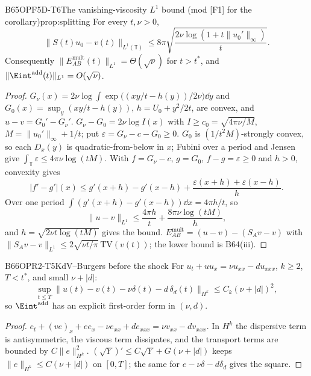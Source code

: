 \begin{dimcard}{B65}{OPF5D-T6}{The vanishing-viscosity $L^1$ bound}{\proved{} (mod [F1] for the corollary)}{prop:splitting}
For every $t,\nu>0$,
\[
\|S(t)u_0-v(t)\|_{L^1(\mathbb T)}\le8\pi\sqrt{\frac{2\nu\log(1+t\|u_0'\|_\infty)}{t}}.
\]
Consequently $\|E^{\mathrm{mult}}_{AB}(t)\|_{L^1}=\Theta(\sqrt\nu)$ for $t>t^*$, and $\|\Eint^{\mathrm{add}}(t)\|_{L^1}=O(\sqrt\nu)$.
\end{dimcard}
\begin{proof}
$G_\nu(x)=2\nu\log\int\exp\big((xy/t-h(y))/2\nu\big)\dd y$ and $G_0(x)=\sup_y(xy/t-h(y))$, $h=U_0+y^2/2t$, are convex, and $u-v=G_0'-G_\nu'$.
$G_\nu-G_0=2\nu\log I(x)$ with $I\ge c_0=\sqrt{4\pi\nu/M}$, $M=\|u_0'\|_\infty+1/t$; put $\varepsilon=G_\nu-c-G_0\ge0$.
$G_0$ is $(1/t^2M)$-strongly convex, so each $D_x(y)$ is quadratic-from-below in $x$; Fubini over a period and Jensen give $\int_{\mathbb T}\varepsilon\le4\pi\nu\log(tM)$.
With $f=G_\nu-c$, $g=G_0$, $f-g=\varepsilon\ge0$ and $h>0$, convexity gives
\[
|f'-g'|(x)\le g'(x+h)-g'(x-h)+\frac{\varepsilon(x+h)+\varepsilon(x-h)}{h}.
\]
Over one period $\int(g'(x+h)-g'(x-h))\dd x=4\pi h/t$, so
\[
\|u-v\|_{L^1}\le\frac{4\pi h}{t}+\frac{8\pi\nu\log(tM)}{h},
\]
and $h=\sqrt{2\nu t\log(tM)}$ gives the bound.
$E^{\mathrm{mult}}_{AB}=(u-v)-(S_Av-v)$ with $\|S_Av-v\|_{L^1}\le2\sqrt{\nu t/\pi}\,\mathrm{TV}(v(t))$; the lower bound is B64(iii).
\end{proof}

\begin{dimcard}{B66}{OPR2-T5}{KdV--Burgers before the shock}{}{}
For $u_t+uu_x=\nu u_{xx}-du_{xxx}$, $k\ge2$, $T<t^*$, and small $\nu+|d|$:
\[
\sup_{t\le T}\big\|u(t)-v(t)-\nu\delta(t)-d\,\delta_d(t)\big\|_{H^k}\le C_k(\nu+|d|)^2,
\]
so $\Eint^{\mathrm{add}}$ has an explicit first-order form in $(\nu,d)$.
\end{dimcard}
\begin{proof}
$e_t+(ve)_x+ee_x-\nu e_{xx}+de_{xxx}=\nu v_{xx}-dv_{xxx}$. In $H^k$ the dispersive term is antisymmetric, the viscous term dissipates, and the transport terms are bounded by $C\|e\|_{H^k}^2$.
$(\sqrt Y)'\le C\sqrt Y+G(\nu+|d|)$ keeps $\|e\|_{H^k}\le C(\nu+|d|)$ on $[0,T]$; the same for $e-\nu\delta-d\delta_d$ gives the square.
\end{proof}


